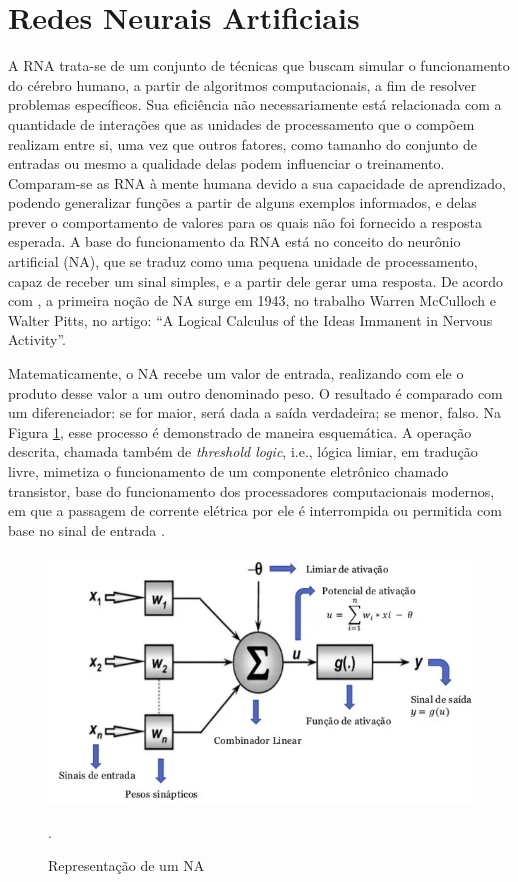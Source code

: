 \section{Redes Neurais Artificiais}
\label{sec:redesneurais}

A RNA trata-se de um conjunto de técnicas que buscam simular o funcionamento do cérebro humano, a partir de algoritmos computacionais, a fim de resolver problemas específicos. Sua eficiência não necessariamente está relacionada com a quantidade de interações que as unidades de processamento que o compõem realizam entre si, uma vez que outros fatores, como tamanho do conjunto de entradas ou mesmo a qualidade delas podem influenciar o treinamento. Comparam-se as RNA à mente humana devido a sua capacidade de aprendizado, podendo generalizar funções a partir de alguns exemplos informados, e delas prever o comportamento de valores para os quais não foi fornecido a resposta esperada. A base do funcionamento da RNA está no conceito do neurônio artificial (NA), que se traduz como uma pequena unidade de processamento, capaz de receber um sinal simples, e a partir dele gerar uma resposta.  De acordo com  \cite{fleck2016redes}, a primeira noção de NA surge em 1943, no trabalho Warren McCulloch e Walter Pitts, no artigo: “A Logical Calculus of the Ideas Immanent in Nervous Activity”.

Matematicamente, o NA recebe um valor de entrada, realizando com ele o produto desse valor a um outro denominado peso. O resultado é comparado com um diferenciador: se for maior, será dada a saída verdadeira; se menor, falso. Na Figura \ref{fig:na}, esse processo é demonstrado de maneira esquemática. A operação descrita, chamada também de \textit{threshold logic}, i.e., lógica limiar, em tradução livre, mimetiza o funcionamento de um componente eletrônico chamado transistor, base do funcionamento dos processadores computacionais modernos, em que a passagem de corrente elétrica por ele é interrompida ou permitida com base no sinal de entrada \cite{mcculloch1943logical}. 

\begin{figure}[!h]
    \centering
    \begin{minipage}{1\linewidth}
    \centering
    \captionsetup{justification=centering,margin=0.5cm,font=small}
    \includegraphics[width=1\linewidth]{img/cap2/na-completo.png}
    \caption{Representação de um NA \cite{adorno2017}}.
    \label{fig:na}
    \end{minipage}
\end{figure}

